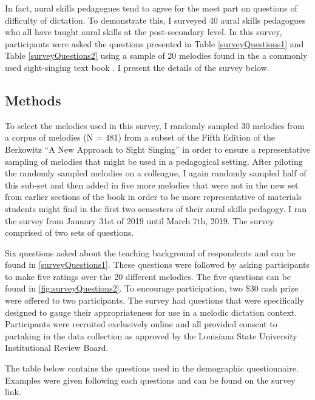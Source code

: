 \documentclass[12pt,]{book}
\begin{document}
In fact, aural skills pedagogues tend to agree for the most part on questions of difficulty of dictation.
To demonstrate this, I surveyed 40 aural skills pedagogues who all have taught aural skills at the post-secondary level.
In this survey, participants were asked the questions presented in Table \ref{surveyQuestions1} and Table \ref{surveyQuestions2} using a sample of 20 melodies found in the a commonly used sight-singing text book \citep{berkowitzNewApproachSight2011}.
I present the details of the survey below.

\hypertarget{methods}{%
\subsection{Methods}\label{methods}}

To select the melodies used in this survey, I randomly sampled 30 melodies from a corpus of melodies (N = 481) from a subset of the Fifth Edition of the Berkowitz ``A New Approach to Sight Singing'' \citep{berkowitzNewApproachSight2011} in order to ensure a representative sampling of melodies that might be used in a pedagogical setting.
After piloting the randomly sampled melodies on a colleague, I again randomly sampled half of this sub-set and then added in five more melodies that were not in the new set from earlier sections of the book in order to be more representative of materials students might find in the first two semesters of their aural skills pedagogy.
I ran the survey from January 31st of 2019 until March 7th, 2019.
The survey comprised of two sets of questions.

Six questions asked about the teaching background of respondents and can be found in \ref{surveyQuestions1}.
These questions were followed by asking participants to make five ratings over the 20 different melodies.
The five questions can be found in \ref{fig:surveyQuestions2}.
To encourage participation, two \$30 cash prize were offered to two participants.
The survey had questions that were specifically designed to gauge their appropriateness for use in a melodic dictation context.
Participants were recruited exclusively online and all provided consent to partaking in the data collection as approved by the Louisiana State University Institutional Review Board.

The table below contains the questions used in the demographic questionnaire.
Examples were given following each questions and can be found on the survey link.
\end{document}
